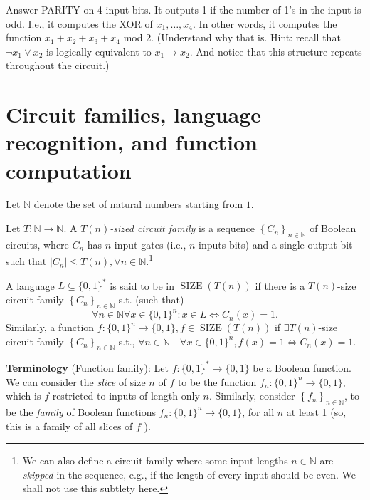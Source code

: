 \begin{trailer}{Answer}
     PARITY on 4 input bits. It outputs 1 if the number of 1's in the input is odd. I.e., it computes the XOR of $x_1, \ldots, x_4$. In other words, it computes the function $x_1+x_2+x_3+x_4$ mod 2. (Understand why that is. Hint: recall that ${\neg x_1}\lor x_2$ is logically equivalent to $x_1\to x_2$. And notice that this structure repeats throughout the circuit.)
\end{trailer}

\section{Circuit families, language recognition, and function computation}

Let $\mathbb{N}$ denote the set of natural numbers starting from $1$.

\begin{definition}
Let $T:\mathbb{N}\rightarrow \mathbb{N}$. 
A \emph{$T(n)$-sized circuit family} is a sequence $\left\{C_n\right\}_{n \in \mathbb{N}}$ of Boolean circuits, where $C_n$ has $n$ input-gates (i.e., $n$ inputs-bits) and a single output-bit such that  $\left|C_n\right| \leq T(n), \forall n \in \mathbb{N}$.\footnote{We can also define a circuit-family where some input lengths $n\in\mathbb{N}$ are \emph{skipped} in the sequence, e.g., if the length of every input should be even. We shall not use this subtlety here.}
\end{definition}

A language $L\subseteq\{0,1\}^*$ is said to be in $\operatorname{SIZE} (T(n))$ if there is a $T(n)$-size circuit family $\left\{C_n\right\}_{n \in \mathbb{N}}$ s.t. (such that) 
$$\forall n \in \mathbb{N} \forall x \in\{0,1\}^n: x \in L \Leftrightarrow C_n(x)=1.$$
Similarly, a function $f:\{0,1\}^n \rightarrow\{0,1\}, f \in \operatorname{SIZE}(T(n))$ if $\exists T(n)$-size circuit family $\left\{C_n\right\}_{n \in \mathbb{N}}$ s.t., $\forall n \in \mathbb{N} \quad \forall x \in\{0,1\}^n, f(x)=1 \Leftrightarrow C_n(x)=1$.

\begin{svgraybox}
\textbf{Terminology} (Function family):
 Let $f:\{0,1\}^*\to\{0,1\}$ be a Boolean function.
We can consider the \emph{slice} of size $n$ of $f$ to be the function $f_n:\{0,1\}^n\to\{0,1\}$, which is $f$ restricted to inputs of length only $n$. 
Similarly, consider $\left\{f_{n}\right\}_{n\in\mathbb{N}}$, to be the \textit{family} of Boolean functions $f_n:\{0,1\}^n\to \{0,1\}$, 
for all $n$ at least 1 (so, this is a family of all slices of $f$ ).
\end{svgraybox}

